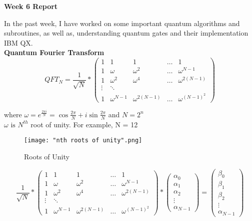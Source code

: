 \documentclass[12pt]{article}
\begin{document}
\begin{center}
\textbf{\Large Week 6 Report}
\end{center}

In the past week, I have worked on some important quantum algorithms and subroutines, as well as, understanding quantum gates and their implementation IBM QX. \\

\textbf{\large Quantum Fourier Transform}
\begin{equation}
QFT_{N} = \frac{1}{\sqrt{N}} *
\begin{pmatrix}
1 & 1 & 1 &\dots & 1 \\
1 & \omega & {\omega}^{2} & \dots &{\omega}^{N-1} \\
1 & {\omega}^{2} & {\omega}^{4} & \dots & {\omega}^{2(N-1)} \\
\vdots & \ddots & \\
1 & {\omega}^{N-1} & {\omega}^{2(N-1)} & \dots & {\omega}^{(N-1)^{2}} 
\end{pmatrix}
\end{equation}

where $\omega = e^{\frac{2\pi i}{N}} = \cos \frac{2\pi}{N} + i \sin \frac{2 \pi}{N}$ and $N = 2^n$ \\

$\omega \text{ is } N^{th}$ root of unity. For example, N = 12
\begin{figure}[h]
    \centering
    \texttt{[image: "nth roots of unity".png]}
    \caption{Roots of Unity}
    \label{fig: roots of unity}
\end{figure}

\begin{equation}
\frac{1}{\sqrt{N}} *
\begin{pmatrix}
1 & 1 & 1 &\dots & 1 \\
1 & \omega & {\omega}^{2} & \dots &{\omega}^{N-1} \\
1 & {\omega}^{2} & {\omega}^{4} & \dots & {\omega}^{2(N-1)} \\
\vdots & \ddots & \\
1 & {\omega}^{N-1} & {\omega}^{2(N-1)} & \dots & {\omega}^{(N-1)^{2}}
\end{pmatrix}
* 
\begin{pmatrix}
\alpha_{0} \\
\alpha_{1} \\
\alpha_{2} \\
\vdots \\
\alpha_{N-1}
\end{pmatrix}
= 
\begin{pmatrix}
\beta_{0} \\
\beta_{1} \\
\beta_{2} \\
\vdots \\
\alpha_{N-1}
\end{pmatrix}
\end{equation}
\end{document}

